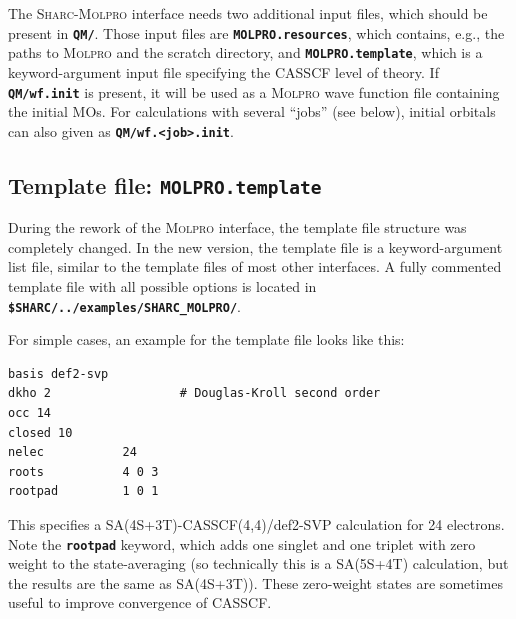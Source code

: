 \documentclass[a4paper,10pt,DIV=15,openany,twoside=false]{scrbook}
\newcommand{\sharc}{\textsc{Sharc}}
\newcommand{\ttt}[1]{\textbf{\texttt{#1}}}
\newenvironment{example}{
  \setlength{\OuterFrameSep}{3pt}
  \vspace{0mm}
  \definecolor{shadecolor}{HTML}{E4F4FF}
  \begin{shaded}
}{
  \end{shaded}
}
\begin{document}
The \sharc-\textsc{Molpro} interface needs two additional input files, which should be present in \ttt{QM/}. Those input files are \ttt{MOLPRO.resources}, which contains, e.g., the paths to \textsc{Molpro} and the scratch directory, and \ttt{MOLPRO.template}, which is a keyword-argument input file specifying the CASSCF level of theory. 
If \ttt{QM/wf.init} is present, it will be used as a \textsc{Molpro} wave function file containing the initial MOs.
For calculations with several ``jobs'' (see below), initial orbitals can also given as \ttt{QM/wf.<job>.init}.

\subsection{Template file: \ttt{MOLPRO.template}}

During the rework of the \textsc{Molpro} interface, the template file structure was completely changed.
In the new version, the template file is a keyword-argument list file, similar to the template files of most other interfaces.
A fully commented template file with all possible options is located in \ttt{\$SHARC/../examples/SHARC\_MOLPRO/}.

For simple cases, an example for the template file looks like this:
\begin{example}
  \begin{verbatim}
basis def2-svp
dkho 2                  # Douglas-Kroll second order
occ 14
closed 10
nelec           24
roots           4 0 3
rootpad         1 0 1
\end{verbatim}
\end{example}
This specifies a SA(4S+3T)-CASSCF(4,4)/def2-SVP calculation for 24 electrons.
Note the \ttt{rootpad} keyword, which adds one singlet and one triplet with zero weight to the state-averaging (so technically this is a SA(5S+4T) calculation, but the results are the same as SA(4S+3T)).
These zero-weight states are sometimes useful to improve convergence of CASSCF.
\end{document}
